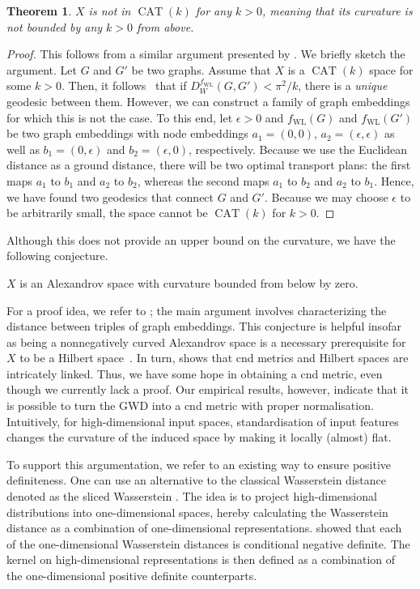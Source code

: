 \documentclass{article}
\DeclareMathOperator{\CAT}{CAT}
\newtheorem{theorem}{Theorem}
\begin{document}
\begin{theorem}
$X$ is not in $\CAT(k)$ for any $k > 0$, meaning that its curvature is \emph{not} bounded by any $k > 0$ from above.
\end{theorem}
\begin{proof}
  This follows from a similar argument presented by \citet{Turner2014}. We briefly sketch the argument.
Let $G$ and $G'$ be two graphs.
  Assume that $X$ is a $\CAT(k)$ space for some $k > 0$.
Then, it follows~\citep[Proposition 2.11, p.\ 23]{bridson2013metric} that if 
  $D^{f_{\mathrm{WL}}}_{W}(G,G') < \pi^2 / k$, there is a \emph{unique} geodesic between them. However, we can construct a family of graph embeddings for which this is not the case. To this end, let $\epsilon > 0$ and $f_\mathrm{WL}(G)$ and $f_\mathrm{WL}(G')$ be two graph embeddings with node embeddings $a_1 = (0, 0)$, $ a_2 = ( \epsilon, \epsilon)$ as well as $b_1 = (0,\epsilon)$ and $b_2 = (\epsilon,0)$, respectively. Because we use the Euclidean distance as a ground distance, there will be two optimal transport plans: the first maps $a_1$ to $b_1$ and $a_2$ to $b_2$, whereas the second maps $a_1$ to $b_2$ and $a_2$ to $b_1$. Hence, we have found two geodesics that connect $G$ and $G'$. Because we may choose $\epsilon$ to be arbitrarily small, the space cannot be $\CAT(k)$ for $k > 0$.
\end{proof}
Although this does not provide an upper bound on the curvature, we have the following conjecture.
\begin{conjecture}
$X$ is an Alexandrov space with curvature bounded from below by zero.
\end{conjecture}
For a proof idea, we refer to \citet{Turner2014}; the main argument involves characterizing the distance between triples of graph embeddings. This conjecture is helpful insofar as being a nonnegatively curved Alexandrov space is a necessary prerequisite for $X$ to be a Hilbert space~\citep{Shin-Ichi2012}. In turn, \citet{feragen2015geodesic} shows that cnd metrics and Hilbert spaces are intricately linked. 
Thus, we have some hope in obtaining a cnd metric, even though we currently lack a proof.
Our empirical results, however, indicate that it is possible to turn the GWD into a cnd metric with proper normalisation. 
Intuitively, for high-dimensional input spaces, standardisation of input features changes the curvature of the induced space by making it locally (almost) flat.

To support this argumentation, we refer to an existing way to ensure positive definiteness. One can use an alternative to the classical Wasserstein distance denoted as the sliced Wasserstein \citep{rabin2011wasserstein}. The idea is to project high-dimensional distributions into one-dimensional spaces, hereby calculating the Wasserstein distance as a combination of one-dimensional representations. 
\citet{kolouri2016sliced} showed that each of the one-dimensional Wasserstein distances is conditional negative definite.
The kernel on high-dimensional representations is then defined as a combination of the one-dimensional positive definite counterparts. 
\end{document}
